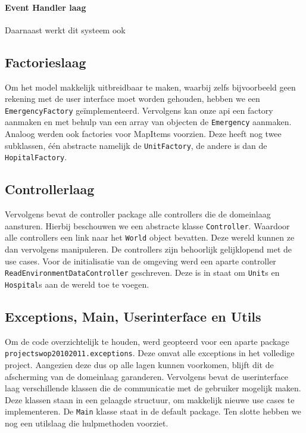 \paragraph{Event Handler laag}
Daarnaast werkt dit systeem ook

\subsection{Factorieslaag}
Om het model makkelijk uitbreidbaar te maken, waarbij zelfs bijvoorbeeld geen rekening met de user interface moet worden gehouden, hebben we een \texttt{EmergencyFactory} ge\"implementeerd. Vervolgens kan onze api een factory aanmaken en met behulp van een array van objecten de \texttt{Emergency} aanmaken. Analoog werden ook factories voor MapItems voorzien. Deze heeft nog twee subklassen, \'e\'en abstracte namelijk de \texttt{UnitFactory}, de andere is dan de \texttt{HopitalFactory}.

\subsection{Controllerlaag}
Vervolgens bevat de controller package alle controllers die de domeinlaag aansturen. Hierbij beschouwen we een abstracte klasse \texttt{Controller}. Waardoor alle controllers een link naar het \texttt{World} object bevatten. Deze wereld kunnen ze dan vervolgens manipuleren. De controllers zijn behoorlijk gelijklopend met de use cases. Voor de initialisatie van de omgeving werd een aparte controller \texttt{ReadEnvironmentDataController} geschreven. Deze is in staat om \texttt{Unit}s en \texttt{Hospital}s aan de wereld toe te voegen.

\subsection{Exceptions, Main, Userinterface en Utils}
Om de code overzichtelijk te houden, werd geopteerd voor een aparte package \texttt{projectswop20102011.\-exceptions}. Deze omvat alle exceptions in het volledige project. 
Aangezien deze dus op alle lagen kunnen voorkomen, blijft dit de afscherming van de domeinlaag garanderen. Vervolgens bevat de userinterface laag verschillende klassen die de communicatie met de gebruiker mogelijk maken. Deze klassen staan in een gelaagde structuur, om makkelijk nieuwe use cases te implementeren. De \texttt{Main} klasse staat in de default package. Ten slotte hebben we nog een utilslaag die hulpmethoden voorziet.
